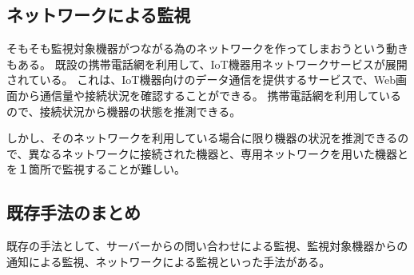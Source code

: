 \subsection{ネットワークによる監視}
	そもそも監視対象機器がつながる為のネットワークを作ってしまおうという動きもある。
	既設の携帯電話網を利用して、IoT機器用ネットワークサービスが展開されている。
	これは、IoT機器向けのデータ通信を提供するサービスで、Web画面から通信量や接続状況を確認することができる。
	携帯電話網を利用しているので、接続状況から機器の状態を推測できる。

	しかし、そのネットワークを利用している場合に限り機器の状況を推測できるので、異なるネットワークに接続された機器と、専用ネットワークを用いた機器とを１箇所で監視することが難しい。

\subsection{既存手法のまとめ}
	既存の手法として、サーバーからの問い合わせによる監視、監視対象機器からの通知による監視、ネットワークによる監視といった手法がある。





